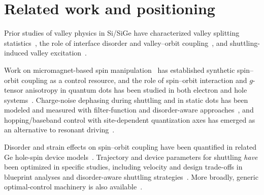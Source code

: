 \documentclass[aip,jap,reprint,superscriptaddress,longbibliography,floatfix]{revtex4-2}
\begin{document}
\section{Related work and positioning}

Prior studies of valley physics in Si/SiGe have characterized valley
splitting statistics~\cite{paquelet_wuetz_atomic_2022,losert_practical_2023},
the role of interface disorder and valley--orbit
coupling~\cite{friesen_theory_2010,hosseinkhani_theory_2022}, and
shuttling-induced valley
excitation~\cite{langrock_blueprint_2023,losert_strategies_2024,volmer_mapping_2024,oda_suppressing_2026}.

Work on micromagnet-based
spin manipulation~\cite{unseld_baseband_2025,yoneda_quantum-dot_2018} has
established synthetic
spin--orbit coupling as a control resource, and the role of
spin--orbit interaction and $g$-tensor anisotropy in quantum dots has
been studied in both electron and hole
systems~\cite{tanttu_controlling_2019,jin_probing_2024,geyer_anisotropic_2024,hendrickx_sweet-spot_2024}.
Charge-noise dephasing
during shuttling and in static dots has been modeled and measured with
filter-function and disorder-aware
approaches~\cite{langrock_blueprint_2023,struck_low-frequency_2020,krzywda_coherence_2026,burkard_semiconductor_2023,yoneda_noise-correlation_2023},
and hopping/baseband control with site-dependent quantization axes has
emerged as an alternative to resonant
driving~\cite{wang_operating_2024,unseld_baseband_2025}.

Disorder and
strain effects on spin--orbit coupling have been quantified in related
Ge hole-spin device models~\cite{sarkar_effect_2025,mauro_strain_2025}.
Trajectory and device parameters for shuttling \emph{have} been
optimized in specific studies, including velocity and design trade-offs
in blueprint analyses and disorder-aware shuttling
strategies~\cite{langrock_blueprint_2023,losert_strategies_2024}.
More broadly, generic optimal-control machinery is also
available~\cite{khaneja_optimal_2005,niu_universal_2019}.
\end{document}
